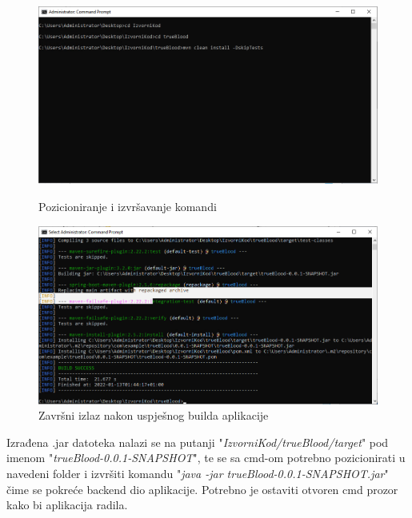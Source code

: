			\begin{figure}[!tbp]
				\centering
				\begin{minipage}[b]{0.4\textwidth}
					\includegraphics[width=\textwidth]{slike/CmdCommands}
					\caption{Pozicioniranje i izvršavanje komandi}
					\label{fig:CmdCommands}
				\end{minipage}
				\hfill
				\begin{minipage}[b]{0.4\textwidth}
					\includegraphics[width=\textwidth]{slike/cmdBuildFinished}
					\caption{Završni izlaz nakon uspješnog builda aplikacije}
					\label{fig:cmdBuildFinished}
				\end{minipage}
			\end{figure}

			Izrađena .jar datoteka nalazi se na putanji "\textit{IzvorniKod/trueBlood/target}" pod imenom "\textit{trueBlood-0.0.1-SNAPSHOT}", te se sa cmd-om potrebno pozicionirati u navedeni folder i izvršiti komandu "\textit{java -jar trueBlood-0.0.1-SNAPSHOT.jar}" čime se pokreće backend dio aplikacije. Potrebno je ostaviti otvoren cmd prozor kako bi aplikacija radila.\\
			

